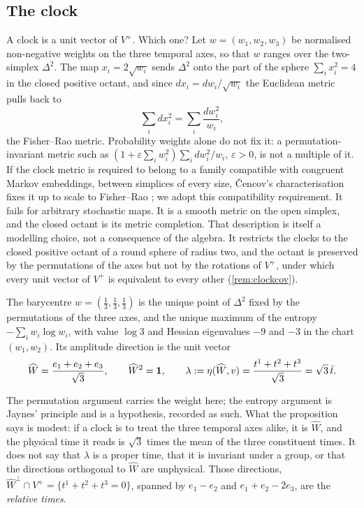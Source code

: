 \subsection{The clock}
\label{sec:clocksimplex}

A clock is a unit vector of $V^+$. Which one? Let $w=(w_1,w_2,w_3)$ be normalised non-negative weights on the three temporal
axes, so that $w$ ranges over the two-simplex $\Delta^2$. The map $x_i=2\sqrt{w_i}$ sends $\Delta^2$ onto the part of the sphere
$\sum_ix_i^2=4$ in the closed positive octant, and since $dx_i=dw_i/\sqrt{w_i}$ the Euclidean metric pulls back to
\[
\sum_idx_i^2=\sum_i\frac{dw_i^2}{w_i},
\]
the Fisher--Rao metric. Probability weights alone do not fix it: a permutation-invariant metric such as
$(1+\varepsilon\sum_iw_i^2)\sum_idw_i^2/w_i$, $\varepsilon>0$, is not a multiple of it. If the clock metric is required to belong to a family
compatible with congruent Markov embeddings, between simplices of every size, \v{C}encov's characterisation fixes it up to scale to
Fisher--Rao \cite{Cencov,AmariNagaoka,AyJostLeSchwachhofer15}; we adopt this compatibility requirement. It fails for arbitrary stochastic maps. It is a smooth metric on the open simplex, and the closed octant is
its metric completion. That description is itself a modelling choice, not a consequence of the algebra. It restricts the clocks to
the closed positive octant of a round sphere of radius two, and the octant is preserved by the permutations of the axes but not by the
rotations of $V^+$, under which every unit vector of $V^+$ is equivalent to every other (\cref{rem:clockcov}).

\begin{proposition}
\label{prop:clock}
The barycentre $w=(\tfrac13,\tfrac13,\tfrac13)$ is the unique point of $\Delta^2$ fixed by the permutations of the three axes, and the
unique maximum of the entropy $-\sum_iw_i\log w_i$, with value $\log3$ and Hessian eigenvalues $-9$ and $-3$ in the chart
$(w_1,w_2)$. Its amplitude direction is the unit vector
\[
\widehat W=\frac{e_1+e_2+e_3}{\sqrt3},\qquad \widehat W^2=\mathbf 1,\qquad
\lambda:=\eta(\widehat W,v)=\frac{t^1+t^2+t^3}{\sqrt3}=\sqrt3\,\bar t .
\]
\end{proposition}

The permutation argument carries the weight here; the entropy argument is Jaynes' principle and is a hypothesis, recorded as
such. What the proposition says is modest: if a clock is to treat the three temporal axes alike, it is $\widehat W$, and the
physical time it reads is $\sqrt3$ times the mean of the three constituent times. It does not say that $\lambda$ is a proper time,
that it is invariant under a group, or that the directions orthogonal to $\widehat W$ are unphysical. Those directions,
$\widehat W^\perp\cap V^+=\{t^1+t^2+t^3=0\}$, spanned by $e_1-e_2$ and $e_1+e_2-2e_3$, are the \emph{relative times}.


